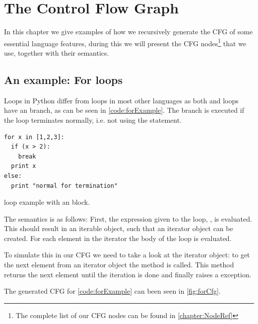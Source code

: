 \chapter{The Control Flow Graph}
\label{chap:CFGConstruction}
In this chapter we give examples of how we recursively generate the CFG of some essential language features, during this we will present the CFG nodes\footnote{The complete list of our CFG nodes can be found in \autoref{chapter:NodeRef}} that we use, together with their semantics.


\section{An example: For loops}
\label{sec:CFGConstructionLoops}
Loops in Python differ from loops in most other languages as both  and  loops have an  branch, as can be seen in \autoref{code:forExample}. The  branch is executed if the loop terminates normally, i.e. not using the  statement.

\begin{listing}[H]
  \begin{verbatim}
for x in [1,2,3]:
  if (x > 2):
    break
  print x
else:
  print "normal for termination"
  \end{verbatim}
  \caption{ loop example with an  block.}\label{code:forExample}
\end{listing}

The semantics is as follows: First, the expression given to the loop, \inlinecode{[1,2,3]}, is evaluated. This should result in an iterable object, such that an iterator object can be created. For each element in the iterator the body of the loop is evaluated.

To simulate this in our CFG we need to take a look at the iterator object: to get the next element from an iterator object the  method is called. This method returns the next element until the iteration is done and finally raises a  exception.

The generated CFG for \autoref{code:forExample} can been seen in \autoref{fig:forCfg}.


